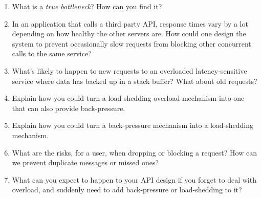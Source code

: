 \documentclass[11pt, oneside]{book}   	%
\begin{document}
\begin{enumerate}
	\item What is a \emph{true bottleneck}? How can you find it?
	\item In an application that calls a third party API, response times vary by a lot depending on how healthy the other servers are. How could one design the system to prevent occasionally slow requests from blocking other concurrent calls to the same service?
	\item What's likely to happen to new requests to an overloaded latency-sensitive service where data has backed up in a stack buffer? What about old requests?
	\item Explain how you could turn a load-shedding overload mechanism into one that can also provide back-pressure.
	\item Explain how you could turn a back-pressure mechanism into a load-shedding mechanism. 
	\item What are the risks, for a user, when dropping or blocking a request? How can we prevent duplicate messages or missed ones?
	\item What can you expect to happen to your API design if you forget to deal with overload, and suddenly need to add back-pressure or load-shedding to it?
\end{enumerate}
\end{document}
